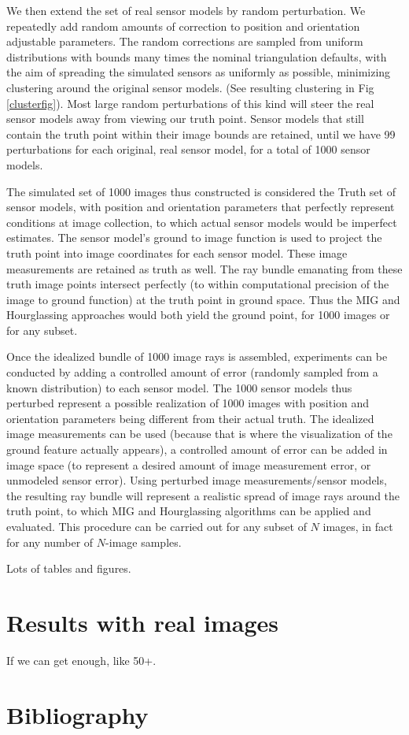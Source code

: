 \documentclass{article}
\begin{document}
We then extend the set of real sensor models by random
perturbation. We repeatedly add random amounts of correction to
position and orientation adjustable parameters. The random corrections
are sampled from uniform distributions with bounds many times the
nominal triangulation defaults, with the aim of spreading the
simulated sensors as uniformly as possible, minimizing clustering
around the original sensor models. (See resulting clustering in Fig
\ref{clusterfig}). Most large random perturbations of this kind will
steer the real sensor models away from viewing our truth point. Sensor
models that still contain the truth point within their image bounds
are retained, until we have 99 perturbations for each original, real
sensor model, for a total of 1000 sensor models.

The simulated set of 1000 images thus constructed is considered the
Truth set of sensor models, with position and orientation parameters
that perfectly represent conditions at image collection, to which
actual sensor models would be imperfect estimates. The sensor model's
ground to image function is used to project the truth point into image
coordinates for each sensor model. These image measurements are
retained as truth as well. The ray bundle emanating from these truth
image points intersect perfectly (to within computational precision of
the image to ground function) at the truth point in ground space. Thus
the MIG and Hourglassing approaches would both yield the ground point,
for 1000 images or for any subset.

Once the idealized bundle of 1000 image rays is assembled, experiments
can be conducted by adding a controlled amount of error (randomly
sampled from a known distribution) to each sensor model. The 1000
sensor models thus perturbed represent a possible realization of 1000
images with position and orientation parameters being different from
their actual truth. The idealized image measurements can be used
(because that is where the visualization of the ground feature
actually appears), a controlled amount of error can be added in image
space (to represent a desired amount of image measurement error, or
unmodeled sensor error). Using perturbed image measurements/sensor
models, the resulting ray bundle will represent a realistic spread of
image rays around the truth point, to which MIG and Hourglassing
algorithms can be applied and evaluated. This procedure can be carried
out for any subset of $N$ images, in fact for any number of $N$-image
samples.

Lots of tables and figures.

\section{Results with real images}
If we can get enough, like 50+.


\section{Bibliography}
\end{document}

